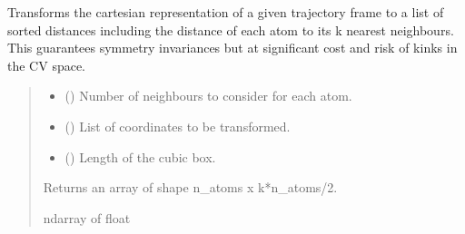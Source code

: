 \documentclass[a4paper,10pt,english]{report}
\begin{document}
\begin{fulllineitems}
\label{\detokenize{NNucleate:NNucleate.data_augmentation.transform_frame_to_knn_list}}
\pysigstartsignatures
{}
\pysigstopsignatures
\sphinxAtStartPar
Transforms the cartesian representation of a given trajectory frame to a list of sorted distances including the distance of each atom to its k nearest neighbours. This guarantees symmetry invariances but at significant cost and risk of kinks in the CV space.
\begin{quote}\begin{description}
\begin{itemize}
\item {} 
\sphinxAtStartPar
{} () \textendash{} Number of neighbours to consider for each atom.

\item {} 
\sphinxAtStartPar
{} () \textendash{} List of coordinates to be transformed.

\item {} 
\sphinxAtStartPar
{} () \textendash{} Length of the cubic box.

\end{itemize}

\sphinxAtStartPar
Returns an array of shape n\_atoms x k*n\_atoms/2.

\sphinxAtStartPar
ndarray of float

\end{description}\end{quote}

\end{fulllineitems}

\end{document}
